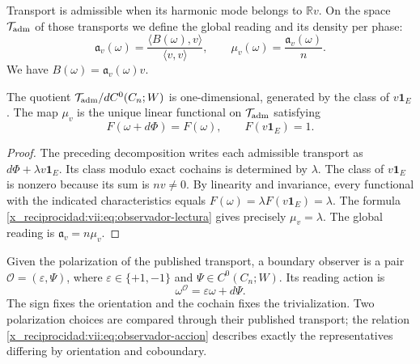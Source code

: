 \begin{definition}
\label{x_reciprocidad:vii:def:observador-admisible}
Transport is admissible when its harmonic mode belongs to
\(\mathbb Rv\). On the space \(\mathcal T_{\rm adm}\) of those
transports we define the global reading and its density per phase:
\begin{equation}
 \mathfrak a_v(\omega)
 =\frac{\langle B(\omega),v\rangle}{\langle v,v\rangle},
 \qquad
 \mu_v(\omega)=\frac{\mathfrak a_v(\omega)}n.
 \label{x_reciprocidad:vii:eq:observador-lectura}
\end{equation}
We have \(B(\omega)=\mathfrak a_v(\omega)v\).
\end{definition}

\begin{theorem}
\label{x_reciprocidad:vii:thm:observador-unicidad}
The quotient
\(\mathcal T_{\rm adm}/dC^0(C_n;W)\) is one-dimensional, generated
by the class of \(v\mathbf1_E\). The map \(\mu_v\) is the
unique linear functional on \(\mathcal T_{\rm adm}\) satisfying
\[
 F(\omega+d\Phi)=F(\omega),\qquad F(v\mathbf1_E)=1.
\]
\end{theorem}

\begin{proof}
The preceding decomposition writes each admissible transport as
\(d\Phi+\lambda v\mathbf1_E\). Its class modulo exact cochains
is determined by \(\lambda\). The class of \(v\mathbf1_E\)
is nonzero because its sum is \(nv\neq0\). By linearity and
invariance, every functional with the indicated characteristics equals
\(F(\omega)=\lambda F(v\mathbf1_E)=\lambda\). The formula
\eqref{x_reciprocidad:vii:eq:observador-lectura} gives precisely \(\mu_v=\lambda\).
The global reading is \(\mathfrak a_v=n\mu_v\).
\end{proof}

\begin{definition}
\label{x_reciprocidad:vii:def:observador-borde}
Given the polarization of the published transport, a boundary observer
is a pair \(\mathcal O=(\varepsilon,\Psi)\), where
\(\varepsilon\in\{+1,-1\}\) and \(\Psi\in C^0(C_n;W)\).
Its reading action is
\begin{equation}
 \omega^{\mathcal O}=\varepsilon\omega+d\Psi.
 \label{x_reciprocidad:vii:eq:observador-accion}
\end{equation}
The sign fixes the orientation and the cochain fixes the trivialization.
Two polarization choices are compared through their published
transport; the relation \eqref{x_reciprocidad:vii:eq:observador-accion} describes
exactly the representatives differing by orientation and coboundary.
\end{definition}

